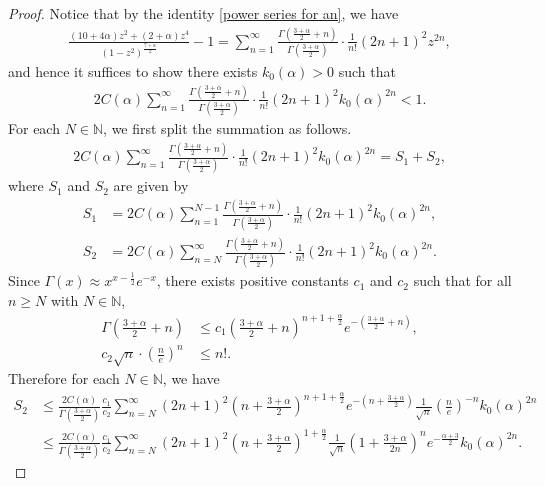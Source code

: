 \documentclass[reqno]{amsart}%
\theoremstyle{definition}
\theoremstyle{remark}
\numberwithin{equation}{section}
\newcommand{\0}{\mathbf{0}}
\newcommand{\1}{\mathbf{1}}
\numberwithin{equation}{section}
\numberwithin{theorem}{section}
\numberwithin{figure}{section}
\begin{document}
\begin{proof}
Notice that by the identity \eqref{power series for an}, we have
\begin{align*}
 \frac{(10 + 4 \alpha) z^2 + (2 + \alpha) z^4}{(1 - z^2)^{\frac{7 + \alpha}{2}}} -1 = \sum_{n=1}^{\infty}  \frac{\Gamma\left(\frac{3 + \alpha}{2} + n\right)}{\Gamma\left(\frac{3 + \alpha}{2}\right)} \cdot \frac{1}{n!} (2n + 1)^{2} z^{2n},
\end{align*}
and hence it suffices to show there exists $k_0(\alpha)>0$ such that 
\begin{align}\label{equiv form of k_0 alpha}
2C(\alpha)\sum_{n=1}^{\infty}  \frac{\Gamma\left(\frac{3 + \alpha}{2} + n\right)}{\Gamma\left(\frac{3 + \alpha}{2}\right)} \cdot \frac{1}{n!} (2n + 1)^{2} k_0(\alpha)^{2n}<1.
\end{align}
For each $N\in\mathbb{N}$, we first split the summation as follows.
\begin{align*}
2C(\alpha)\sum_{n=1}^{\infty}  \frac{\Gamma\left(\frac{3 + \alpha}{2} + n\right)}{\Gamma\left(\frac{3 + \alpha}{2}\right)} \cdot \frac{1}{n!} (2n + 1)^{2} k_0(\alpha)^{2n}=S_1+S_2,
\end{align*}
where $S_1$ and $S_2$ are given by
\begin{align*}
S_1&=2C(\alpha)\sum_{n=1}^{N-1}  \frac{\Gamma\left(\frac{3 + \alpha}{2} + n\right)}{\Gamma\left(\frac{3 + \alpha}{2}\right)} \cdot \frac{1}{n!} (2n + 1)^{2} k_0(\alpha)^{2n},\\
S_2&=2C(\alpha)\sum_{n=N}^{\infty}  \frac{\Gamma\left(\frac{3 + \alpha}{2} + n\right)}{\Gamma\left(\frac{3 + \alpha}{2}\right)} \cdot \frac{1}{n!} (2n + 1)^{2} k_0(\alpha)^{2n}.
\end{align*}
Since $\Gamma(x)\approx x^{x-\frac{1}{2}}e^{-x}$, there exists positive constants $c_1$ and $c_2$ such that for all $n\ge N$ with $N\in\mathbb{N}$,
\begin{align*}
\Gamma(\frac{3+\alpha}{2}+n)&\le c_1(\frac{3+\alpha}{2}+n)^{n+1+\frac{\alpha}{2}}e^{-(\frac{3+\alpha}{2}+n)},\\
c_2\sqrt{n}\cdot(\frac{n}{e})^n&\le n!.
\end{align*}
Therefore for each $N\in\mathbb{N}$, we have
\begin{align*}
S_2&\le \frac{2C(\alpha)}{\Gamma(\frac{3 + \alpha}{2})}\frac{c_1}{c_2}\sum_{n=N}^\infty(2n+1)^2(n+\frac{3+\alpha}{2})^{n+1+\frac{\alpha}{2}}e^{-(n+\frac{3+\alpha}{2})}\frac{1}{\sqrt{n}}(\frac{n}{e})^{-n}k_0(\alpha)^{2n}\\
&\le \frac{2C(\alpha)}{\Gamma(\frac{3 + \alpha}{2})}\frac{c_1}{c_2}\sum_{n=N}^\infty(2n+1)^2(n+\frac{3+\alpha}{2})^{1+\frac{\alpha}{2}}\frac{1}{\sqrt{n}}(1+\frac{3+\alpha}{2n})^n e^{-\frac{\alpha+3}{2}}k_0(\alpha)^{2n}.

\end{align*}
\end{proof}
\end{document}
